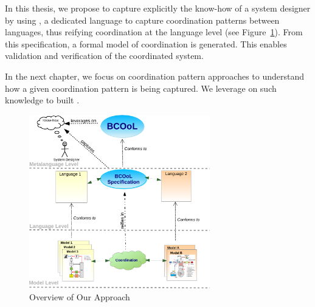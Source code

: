 In this thesis, we propose to capture explicitly the know-how of a system designer by using \bcool, a dedicated language to capture coordination patterns between languages, thus reifying coordination at the language level (see Figure~\ref{fig:bcoolapp}). From this specification, a formal model of coordination is generated. This enables validation and verification of the coordinated system. 

In the next chapter, we focus on coordination pattern approaches to understand how a given coordination pattern is being captured. We leverage on such knowledge to built \bcool. 

\begin{figure}
\begin{center}
\includegraphics[width=0.7\textwidth]{background/figs/bcoolapp}
\caption{Overview of Our Approach}
\label{fig:bcoolapp}
\end{center}
\end{figure}	


